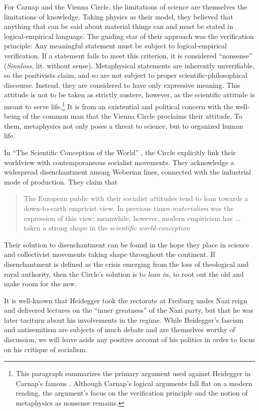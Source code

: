 \documentclass[leqno, 12pt]{turabian-researchpaper}
\begin{document}
	For Carnap and the Vienna Circle, the limitations of science are themselves the
	limitations of knowledge. Taking physics as their model, they believed that anything
	that can be said about material things can and must be stated in logical-empirical
	language. The guiding star of their approach was the verification principle: Any
	meaningful statement must be subject to logical-empirical verification. If a
	statement fails to meet this criterion, it is considered \enquote{nonsense} (\textit{Sinnloss},
	lit. without sense). Metaphysical statements are inherently unverifiable, so the
	positivists claim, and so are not subject to proper scientific-philosophical
	discourse. Instead, they are considered to have only expressive meaning. This attitude
	is not to be taken as strictly austere, however, as the scientific attitude is
	meant to serve life.\footnote{This paragraph summarizes the primary argument
	used against Heidegger in Carnap's famous \autocite{carnap1966}.
	Although Carnap's logical arguments fall flat on a modern reading, the argument's
	focus on the verification principle and the notion of metaphysics as nonsense remains.}
	It is from an existential and political concern with the well-being of the common
	man that the Vienna Circle proclaims their attitude. To them, metaphysics not only
	poses a threat to science, but to organized human life.

	In \enquote{The Scientific Conception of the World} \autocite{hahn1973}, the Circle
	explicitly link their worldview with contemporaneous socialist movements. They
	acknowledge a widespread disenchantment among Weberian lines, connected with the
	industrial mode of production. They claim that \blockquote[{\cite[p21f]{hahn1973}}]{The European public with their socialist attitudes tend to lean towards a down-to-earth empricist view. In previous times \emph{materialism} was the expression of this view; meanwhile, however, modern empiricism has ... taken a strong shape in the \emph{scientific world-conception}}.
	Their solution to disenchantment can be found in the hope they place in science
	and collectivist movements taking shape throughout the continent. If
	disenchantment is defined as the crisis emerging from the loss of theological
	and royal authority, then the Circle's solution is to \emph{lean in,} to root
	out the old and make room for the new.

	It is well-known that Heidegger took the rectorate at Freiburg under Nazi
	reign and delivered lectures on the \enquote{inner greatness} of the Nazi party,
	but that he was later taciturn about his involvements in the regime. While Heidegger's
	fascism and antisemitism are subjects of much debate and are themselves worthy
	of discussion, we will leave aside any positive account of his politics in
	order to focus on his critique of socialism.
\end{document}
